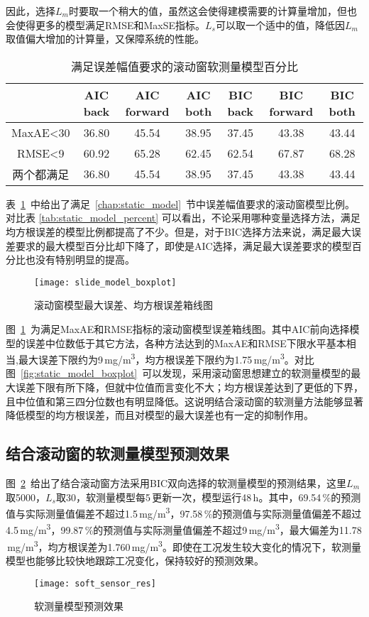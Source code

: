 因此，选择$L_{m}$时要取一个稍大的值，虽然这会使得建模需要的计算量增加，但也会使得更多的模型满足RMSE和MaxSE指标。$L_{s}$可以取一个适中的值，降低因$L_{m}$取值偏大增加的计算量，又保障系统的性能。
\begingroup
\renewcommand*{\arraystretch}{1.67}
\begin{table}[!h]
\small
\centering
\caption[满足误差幅值要求的滚动窗软测量模型百分比]{满足误差幅值要求的滚动窗软测量模型百分比} \label{tab:sw_model_percent}
\begin{tabular}{ccccccc}
\hline\hline 
	&AIC back	&AIC forward	&AIC both	&BIC back	&BIC forward	&BIC both\\
\hline
MaxAE<30	&36.80&45.54	&38.95	&37.45	&43.38	&43.44\\
RMSE<9	&60.92	&65.28&	62.45	&62.54	&67.87	&68.28\\
两个都满足	&36.80&	45.54	&38.95	&37.45	&43.38	&43.44\\
\hline\hline
\end{tabular}
\end{table}
\endgroup

表~\ref{tab:sw_model_percent}~中给出了满足~\ref{chap:static_model}~节中误差幅值要求的滚动窗模型比例。对比表 \ref{tab:static_model_percent} 可以看出，不论采用哪种变量选择方法，满足均方根误差的模型比例都提高了不少。但是，对于BIC选择方法来说，满足最大误差要求的最大模型百分比却下降了，即使是AIC选择，满足最大误差要求的模型百分比也没有特别明显的提高。

\begin{figure}[!hbt]
\centering
\texttt{[image: slide\_model\_boxplot]}
\caption{滚动窗模型最大误差、均方根误差箱线图} \label{fig:slide_model_boxplot}
\end{figure}

图~\ref{fig:slide_model_boxplot}~为满足MaxAE和RMSE指标的滚动窗模型误差箱线图。其中AIC前向选择模型的误差中位数低于其它方法，各种方法达到的MaxAE和RMSE下限水平基本相当,最大误差下限约为9$\,$\si{mg/m^3}，均方根误差下限约为1.75$\,$\si{mg/m^3}。对比图~\ref{fig:static_model_boxplot}~可以发现，采用滚动窗思想建立的软测量模型的最大误差下限有所下降，但就中位值而言变化不大；均方根误差达到了更低的下界，且中位值和第三四分位数也有明显降低。这说明结合滚动窗的软测量方法能够显著降低模型的均方根误差，而且对模型的最大误差也有一定的抑制作用。

\subsection{结合滚动窗的软测量模型预测效果}
图~\ref{fig:soft_sensor_res}~给出了结合滚动窗方法采用BIC双向选择的软测量模型的预测结果，这里$L_m$取5000，$L_s$取30，软测量模型每5$\,$\si{\min}更新一次，模型运行48$\,$\si{\hour}。其中，69.54$\,\%$的预测值与实际测量值偏差不超过1.5$\,$\si{mg/m^3}，97.58$\,\%$的预测值与实际测量值偏差不超过4.5$\,$\si{mg/m^3}，99.87$\,\%$的预测值与实际测量值偏差不超过9$\,$\si{mg/m^3}，最大偏差为11.78$\,$\si{mg/m^3}，均方根误差为1.760$\,$\si{mg/m^3}。即使在工况发生较大变化的情况下，软测量模型也能够比较快地跟踪工况变化，保持较好的预测效果。
\begin{figure}[!hbt]
\centering
\texttt{[image: soft\_sensor\_res]}
\caption{软测量模型预测效果} \label{fig:soft_sensor_res}
\end{figure}

